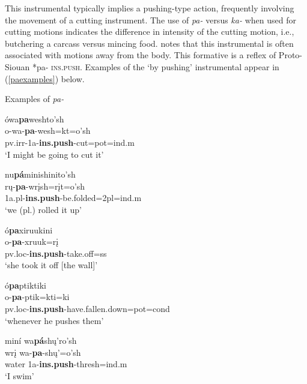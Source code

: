\label{ParaByPushing}

This instrumental typically implies a pushing-type action, frequently involving the movement of a cutting instrument. The use of \textit{pa-} versus \textit{ka-} when used for cutting motions indicates the difference in intensity of the cutting motion, i.e., butchering a carcass versus mincing food. \citet[461]{hollow1970} notes that this instrumental is often associated with motions away from the body. This formative is a reflex of Proto-Siouan *pa- \textsc{ins.push}. Examples of the `by pushing' instrumental appear in (\ref{paexamples}) below.

\begin{exe}
\item\label{paexamples} Examples of \textit{pa-}

	\begin{xlist}
	
	\item \glll ówa\textbf{pa}weshto'sh\\
	o-wa-\textbf{pa}-wesh=kt=o'sh\\
	pv.irr-1a-\textbf{ins.push}-\textnormal{cut}=pot=ind.m\\
	\glt `I might be going to cut it' \citep[454]{hollow1970}

	\item \glll nu\textbf{pá}minishinito'sh\\
	rų-\textbf{pa}-wrįsh=rįt=o'sh\\
	1a.pl-\textbf{ins.push}-\textnormal{be.folded}=2pl=ind.m\\
	\glt `we (pl.) rolled it up' \citep[462]{hollow1970}
	
	\item \glll ó\textbf{pa}xiruukini\\
	o-\textbf{pa}-xruuk=rį\\
	pv.loc-\textbf{ins.push}-\textnormal{take.off}=ss\\
	\glt `she took it off [the wall]' \citep[91]{hollow1973a}


	\item \glll ó\textbf{pa}ptiktiki\\
	o-\textbf{pa}-ptik=kti=ki\\
	pv.loc-\textbf{ins.push}-\textnormal{have.fallen.down}=pot=cond\\
	\glt `whenever he pushes them' \citep[105]{hollow1973a}

	\item \glll miní wa\textbf{pá}shų'ro'sh\\
	wrį wa-\textbf{pa}-shų'=o'sh\\
	\textnormal{water} 1a-\textbf{ins.push}-\textnormal{thresh}=ind.m\\
	\glt `I swim' \citep[241]{hollow1970}
	

\end{xlist}
\end{exe}
